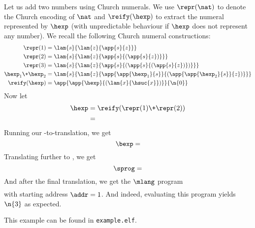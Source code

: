 Let us add two numbers using Church numerals.
We use $\repr(\nat)$ to denote the Church encoding of $\nat$ and $\reify(\hexp)$ to extract the numeral represented by $\hexp$ (with unpredictable behaviour if $\hexp$ does not represent any number).
We recall the following Church numeral constructions:
\begin{align*}
  \repr(1) &= \lam{s}{\lam{z}{\app{s}{z}}} \\
  \repr(2) &= \lam{s}{\lam{z}{\app{s}{(\app{s}{z})}}} \\
  \repr(3) &= \lam{s}{\lam{z}{\app{s}{(\app{s}{(\app{s}{z})})}}} \\
  \hexp_1 \+ \hexp_2 &= \lam{s}{\lam{z}{\app{\app{\hexp_1}{s}}{(\app{\app{\hexp_2}{s}}{z})}}} \\
  \reify(\hexp) &= \app{\app{\hexp}{(\lam{x}{\hsuc{x}})}}{\n{0}}
\end{align*}
Now let
\begin{align*}
  \hexp &= \reify(\repr(1) \+ \repr(2)) \\
  &= 
\end{align*}
Running our \hlang-to-\blang translation, we get
\[
\bexp = 
\]
Translating further to \slang, we get
\[
\sprog = 
\]
And after the final translation, we get the $\mlang$ program
\begin{align*}

\end{align*}
with starting address $\addr = 1$.
And indeed, evaluating this program yields $\n{3}$ as expected.

\Twelf
This example can be found in \texttt{example.elf}.
